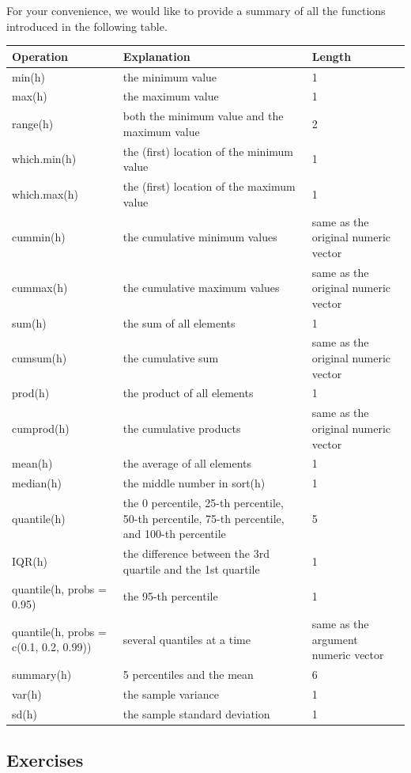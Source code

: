 \documentclass[
]{book}
\begin{document}
For your convenience, we would like to provide a summary of all the functions introduced in the following table.

\begin{tabular}{l|l|l}
\hline
Operation & Explanation & Length\\
\hline
min(h) & the minimum value & 1\\
\hline
max(h) & the maximum value & 1\\
\hline
range(h) & both the minimum value and the maximum value & 2\\
\hline
which.min(h) & the (first) location of the minimum value & 1\\
\hline
which.max(h) & the (first) location of the maximum value & 1\\
\hline
cummin(h) & the cumulative minimum values & same as the original numeric vector\\
\hline
cummax(h) & the cumulative maximum values & same as the original numeric vector\\
\hline
sum(h) & the sum of all elements & 1\\
\hline
cumsum(h) & the cumulative sum & same as the original numeric vector\\
\hline
prod(h) & the product of all elements & 1\\
\hline
cumprod(h) & the cumulative products & same as the original numeric vector\\
\hline
mean(h) & the average of all elements & 1\\
\hline
median(h) & the middle number in sort(h) & 1\\
\hline
quantile(h) & the 0 percentile, 25-th percentile, 50-th percentile, 75-th percentile, and 100-th percentile & 5\\
\hline
IQR(h) & the difference between the 3rd quartile and the 1st quartile & 1\\
\hline
quantile(h, probs = 0.95) & the 95-th percentile & 1\\
\hline
quantile(h, probs = c(0.1, 0.2, 0.99)) & several quantiles at a time & same as the argument numeric vector\\
\hline
summary(h) & 5 percentiles and the mean & 6\\
\hline
var(h) & the sample variance & 1\\
\hline
sd(h) & the sample standard deviation & 1\\
\hline
\end{tabular}

\hypertarget{exercises-10}{%
\subsection{Exercises}\label{exercises-10}}
\end{document}
